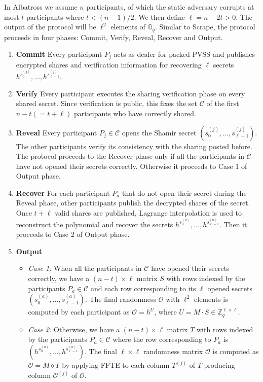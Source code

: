 \documentclass[letterpaper,twocolumn,10pt]{article}
\theoremstyle{definition}
\theoremstyle{remark}
\begin{document}
In Albatross we assume $n$ participants, of which the static adversary corrupts at most $t$ participants where $t<(n-1)/2$. We then define $\ell = n-2t >0 $. The output of the protocol will be $\ell^2$ elements of $\mathbb{G}_q$. Similar to Scrape, the protocol proceeds in four phases: Commit, Verify, Reveal, Recover and Output.
\begin{enumerate}
    \item \textbf{Commit} Every participant $P_j$ acts as dealer for packed PVSS and publishes encrypted shares and verification information for recovering $\ell$ secrets $h^{s^{(j)}_{0}}, \ldots, h^{s^{(j)}_{\ell-1}}$.
    \item \textbf{Verify} Every participant executes the sharing verification phase on every shared secret. Since verification is public, this fixes the set $\mathcal{C}$ of the first $n-t (= t + \ell)$ participants who have correctly shared.
    \item \textbf{Reveal} Every participant $P_j \in \mathcal{C}$ opens the Shamir secret $(s^{(j)}_{0}, \ldots, s^{(j)}_{\ell-1})$. The other participants verify its consistency with the sharing posted before. The protocol proceeds to the Recover phase only if all the participants in $\mathcal{C}$ have not opened their secrets correctly. Otherwise it proceeds to Case 1 of Output phase.
    \item \textbf{Recover} For each participant $P_a$ that do not open their secret during the Reveal phase, other participants publish the decrypted shares of the secret. Once $t+\ell$ valid shares are published, Lagrange interpolation is used to reconstruct the polynomial and recover the secrets $h^{s^{(a)}_{0}}, \ldots, h^{s^{(a)}_{\ell-1}}$. Then it proceeds to Case 2 of Output phase.
    \item \textbf{Output}
        \begin{itemize}
            \item \textit{Case 1:} When all the participants in $\mathcal{C}$ have opened their secrets correctly, we have a $(n-t) \times \ell$ matrix $S$ with rows indexed by the participants  $P_a \in \mathcal{C}$ and each row corresponding to its $\ell$ opened secrets $(s^{(a)}_{0}, \ldots, s^{(a)}_{\ell-1})$. The final randomness $\mathcal{O}$ with $\ell^2$ elements is computed by each participant as $\mathcal{O} = h^U$, where $U = M \cdot S \in \mathbb{Z}_q^{\ell \times \ell}$.
            
            \item \textit{Case 2:} Otherwise, we have a $(n-t) \times \ell$ matrix $T$ with rows indexed by the participants  $P_a \in \mathcal{C}$ where the row corresponding to $P_a$ is $(h^{s^{(a)}_{0}}, \ldots, h^{s^{(a)}_{\ell-1}})$. The final $\ell \times \ell$ randomness matrix $\mathcal{O}$ is computed as $\mathcal{O} = M \diamond T$ by applying FFTE to each column $T^{(j)}$ of $T$ producing column $\mathcal{O}^{(j)}$ of $\mathcal{O}$.
        \end{itemize}
\end{enumerate}
\end{document}

